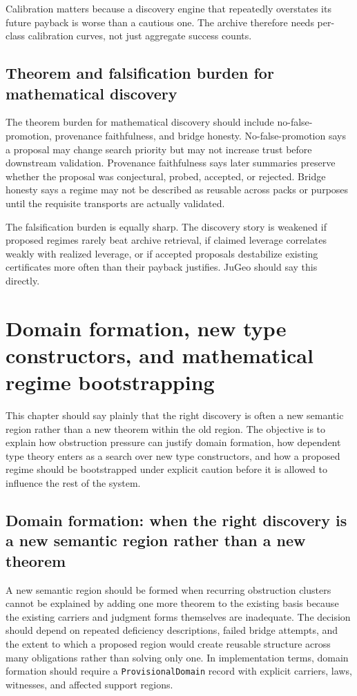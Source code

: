 \documentclass[11pt]{report}
\begin{document}
Calibration matters because a discovery engine that repeatedly overstates its future payback is worse than a cautious one. The archive therefore needs per-class calibration curves, not just aggregate success counts.

\section{Theorem and falsification burden for mathematical discovery}
The theorem burden for mathematical discovery should include no-false-promotion, provenance faithfulness, and bridge honesty. No-false-promotion says a proposal may change search priority but may not increase trust before downstream validation. Provenance faithfulness says later summaries preserve whether the proposal was conjectural, probed, accepted, or rejected. Bridge honesty says a regime may not be described as reusable across packs or purposes until the requisite transports are actually validated.

The falsification burden is equally sharp. The discovery story is weakened if proposed regimes rarely beat archive retrieval, if claimed leverage correlates weakly with realized leverage, or if accepted proposals destabilize existing certificates more often than their payback justifies. JuGeo should say this directly.

\chapter{Domain formation, new type constructors, and mathematical regime bootstrapping}
This chapter should say plainly that the right discovery is often a new semantic region rather than a new theorem within the old region. The objective is to explain how obstruction pressure can justify domain formation, how dependent type theory enters as a search over new type constructors, and how a proposed regime should be bootstrapped under explicit caution before it is allowed to influence the rest of the system.
\section{Domain formation: when the right discovery is a new semantic region rather than a new theorem}
A new semantic region should be formed when recurring obstruction clusters cannot be explained by adding one more theorem to the existing basis because the existing carriers and judgment forms themselves are inadequate. The decision should depend on repeated deficiency descriptions, failed bridge attempts, and the extent to which a proposed region would create reusable structure across many obligations rather than solving only one. In implementation terms, domain formation should require a \texttt{ProvisionalDomain} record with explicit carriers, laws, witnesses, and affected support regions.
\end{document}
